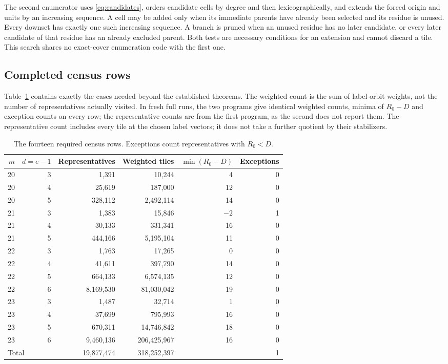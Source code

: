 \documentclass[11pt]{article}
\theoremstyle{definition}
\theoremstyle{remark}
\begin{document}
The second enumerator uses \eqref{eq:candidates}, orders candidate cells
by degree and then lexicographically, and extends the forced origin and
units by an increasing sequence. A cell may be added only when its
immediate parents have already been selected and its residue is unused.
Every downset has exactly one such increasing sequence. A branch is
pruned when an unused residue has no later candidate, or every later
candidate of that residue has an already excluded parent. Both tests
are necessary conditions for an extension and cannot discard a tile.
This search shares no exact-cover enumeration code with the first one.

\subsection{Completed census rows}

Table~\ref{tab:census} contains exactly the cases needed beyond the
established theorems. The weighted count is the sum of label-orbit
weights, not the number of representatives actually visited. In fresh
full runs, the two programs give identical weighted counts, minima of
$R_0-D$ and exception counts on every row; the representative counts
are from the first program, as the second does not report them.
The representative count includes every tile at the chosen label
vectors; it does not take a further quotient by their stabilizers.

\begin{table}[htbp]
\centering
\small
\begin{tabular}{rrrrrr}
\toprule
$m$ & $d=e-1$ & Representatives & Weighted tiles & $\min(R_0-D)$ & Exceptions\\
\midrule
20&3&1,391&10,244&4&0\\
20&4&25,619&187,000&12&0\\
20&5&328,112&2,492,114&14&0\\
21&3&1,383&15,846&$-2$&1\\
21&4&30,133&331,341&16&0\\
21&5&444,166&5,195,104&11&0\\
22&3&1,763&17,265&0&0\\
22&4&41,611&397,790&14&0\\
22&5&664,133&6,574,135&12&0\\
22&6&8,169,530&81,030,042&19&0\\
23&3&1,487&32,714&1&0\\
23&4&37,699&795,993&16&0\\
23&5&670,311&14,746,842&18&0\\
23&6&9,460,136&206,425,967&16&0\\
\midrule
\multicolumn{2}{l}{Total}&19,877,474&318,252,397&&1\\
\bottomrule
\end{tabular}
\caption{The fourteen required census rows. Exceptions count
representatives with $R_0<D$.}\label{tab:census}
\end{table}
\end{document}

